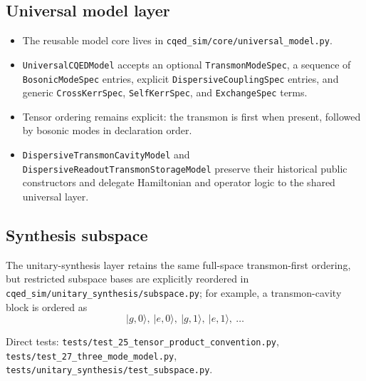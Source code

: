 \documentclass[11pt]{article}
\begin{document}
\subsection*{Universal model layer}
\begin{itemize}[leftmargin=1.5em]
  \item The reusable model core lives in
  \texttt{cqed\_sim/core/universal\_model.py}.
  \item \texttt{UniversalCQEDModel} accepts an optional
  \texttt{TransmonModeSpec}, a sequence of \texttt{BosonicModeSpec} entries,
  explicit \texttt{DispersiveCouplingSpec} entries, and generic
  \texttt{CrossKerrSpec}, \texttt{SelfKerrSpec}, and \texttt{ExchangeSpec} terms.
  \item Tensor ordering remains explicit: the transmon is first when present,
  followed by bosonic modes in declaration order.
  \item \texttt{DispersiveTransmonCavityModel} and
  \texttt{DispersiveReadoutTransmonStorageModel} preserve their historical public
  constructors and delegate Hamiltonian and operator logic to the shared universal layer.
\end{itemize}

\subsection*{Synthesis subspace}
The unitary-synthesis layer retains the same full-space transmon-first ordering,
but restricted subspace bases are explicitly reordered in
\texttt{cqed\_sim/unitary\_synthesis/subspace.py}; for example, a transmon-cavity
block is ordered as
\[
|g,0\rangle,\ |e,0\rangle,\ |g,1\rangle,\ |e,1\rangle,\ \ldots
\]

\noindent
Direct tests:
\texttt{tests/test\_25\_tensor\_product\_convention.py},
\texttt{tests/test\_27\_three\_mode\_model.py},
\texttt{tests/unitary\_synthesis/test\_subspace.py}.
\end{document}
